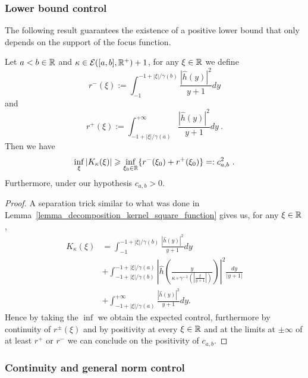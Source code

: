\subsubsection{Lower bound control}

The following result guarantees the existence of a positive lower bound that only depends on the support of the focus function.

\begin{prop}\label{prop_lower_bound_kernel_basic}
	Let $a<b\in\mathbb{R}$ and $\kappa\in \mathcal{E}([a,b],\mathbb{R}^+)+1$, for any $\xi\in\mathbb{R}$ we define 
	\begin{equation}
		r^-(\xi):= \int_{-1}^{-1+|\xi|/\gamma(b)}\frac{|\hat{h}(y)|^2}{y+1}dy
	\end{equation}
	and
	\begin{equation}
		r^+(\xi):= \int_{-1+|\xi|/\gamma(a)}^{+\infty}\frac{|\hat{h}(y)|^2}{y+1}dy\ .
	\end{equation}
	Then we have
	\begin{equation}
		\inf_\xi |K_\kappa(\xi)|\geqslant \inf_{\xi_0\in\mathbb{R}}\{r^-(\xi_0) + r^+(\xi_0) \}=:c_{a,b}^2\ .
	\end{equation}
	Furthermore, under our hypothesis $c_{a,b}>0$.
\end{prop}
\begin{proof}
	A separation trick similar to what was done in Lemma~\ref{lemma_decomposition_kernel_square_function} gives us, for any $\xi\in\mathbb{R}$,
	\begin{align*}
		K_\kappa(\xi) &=  \int_{-1}^{-1+|\xi|/\gamma(b)}\frac{|\hat{h}(y)|^2}{y+1}dy \\
		& + \int_{-1+|\xi|/\gamma(b)}^{-1+|\xi|/\gamma(a)}\left|\hat{h}\left( \frac{y}{\kappa\circ\gamma^{-1}(|\frac{\xi}{y+1}|)} \right)\right|^2\frac{dy}{|y+1|} \\
		& +\int_{-1+|\xi|/\gamma(a)}^{+\infty}\frac{|\hat{h}(y)|^2}{y+1}dy.
	\end{align*}
	Hence by taking the $\inf$ we obtain the expected control, furthermore by continuity of $r^{\pm}(\xi)$ and by positivity at every $\xi\in\mathbb{R}$ and at the limits at $\pm\infty$ of at least $r^+$ or $r^-$ we can conclude on the positivity of $c_{a,b}$.
\end{proof}


\subsubsection{Continuity and general norm control}\label{sssection_continuity_norm_control_frequency_focus}


